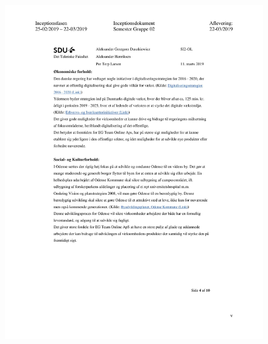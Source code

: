 \begin{figure}[hb]
  \includegraphics[scale = 0.33]{./PNG/Inceptions/Gruppe 02 + InceptionsDokument-38.jpg} 
\end{figure}

